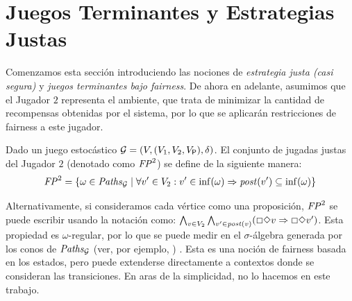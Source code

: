 \section{Juegos Terminantes y Estrategias Justas}\label{sec:fair-strats}

Comenzamos esta sección introduciendo las nociones de \emph{estrategia justa (casi segura)} y \emph{juegos terminantes bajo fairness}. 
De ahora en adelante, asumimos que el Jugador $2$ representa el ambiente, que trata de minimizar la cantidad de recompensas obtenidas por el sistema, por lo que se aplicarán restricciones de fairness a este jugador.

\begin{definition}
   Dado un juego estocástico $\mathcal{G} = (V, (V_1, V_2, V_{\mathsf{P}}), \delta)$.
El conjunto de jugadas justas del Jugador $2$ (denotado como $\mathit{FP}^2$) se define de la siguiente manera:
\[
	\mathit{FP}^2 = \{ \omega \in \mathit{Paths}_{\mathcal{G}} \mid \forall v' \in V_2: v' \in \inf(\omega)  \Rightarrow \mathit{post}(v') \subseteq \inf(\omega) \}
\]
\end{definition}
    Alternativamente, si consideramos cada vértice como una proposición, $\mathit{FP}^2$ se puede escribir usando la notación {\LTL} como:
$\bigwedge_{v \in V_2} \bigwedge_{v' \in \mathit{post}(v)}(\Box \Diamond v \Rightarrow \Box \Diamond v')$. Esta propiedad es $\omega$-regular, por lo que se puede medir en el $\sigma$-álgebra generada por los conos de $\mathit{Paths}_{\mathcal{G}}$ (ver, por ejemplo, \cite[p.804]{BaierK08}) . Esta es una noción de fairness basada en los estados, pero puede extenderse directamente a contextos donde se consideran las transiciones. En aras de la simplicidad, no lo hacemos en este trabajo.
	

